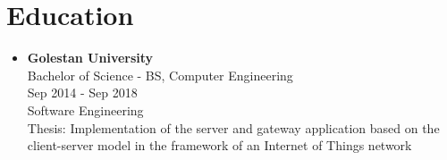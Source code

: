 \section*{\LARGE{Education}}
\begin{itemize}
    \item \large{\textbf{Golestan University}\\}\normalsize{
        Bachelor of Science - BS, Computer Engineering\\
        Sep 2014 - Sep 2018\\
        Software Engineering\\
        Thesis: Implementation of the server and gateway application based on the client-server model in the framework of an Internet of Things network}
\end{itemize}